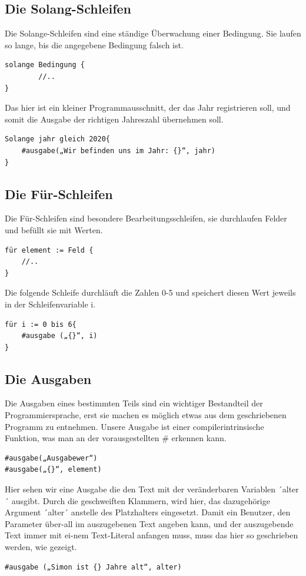 \documentclass[a4paper, 12pt]{article}
\begin{document}
\subsection{Die Solang-Schleifen}
Die Solange-Schleifen sind eine ständige Überwachung einer Bedingung. Sie laufen so lange, bis die angegebene Bedingung falsch ist.

\begin{verbatim}
solange Bedingung {
        //..
}
\end{verbatim}
Das hier ist ein kleiner Programmausschnitt, der das Jahr registrieren soll, und somit die Ausgabe der richtigen Jahreszahl übernehmen soll.

\begin{verbatim}
Solange jahr gleich 2020{
	#ausgabe(„Wir befinden uns im Jahr: {}“, jahr)
}

\end{verbatim}

\subsection{Die Für-Schleifen}
Die Für-Schleifen sind besondere Bearbeitungsschleifen, sie durchlaufen Felder und befüllt sie mit Werten.

\begin{verbatim}
für element := Feld {
    //..
}
\end{verbatim}
Die folgende Schleife durchläuft die Zahlen 0-5 und speichert diesen Wert jeweils in der Schleifenvariable i.
\begin{verbatim}
für i := 0 bis 6{
	#ausgabe („{}“, i)
}
\end{verbatim}

\subsection{Die Ausgaben}
Die Ausgaben eines bestimmten Teils sind ein wichtiger Bestandteil der Programmiersprache, erst sie machen es möglich etwas aus dem geschriebenen Programm zu entnehmen. Unsere Ausgabe ist einer compilerintrinsische Funktion, was man an der vorausgestellten \# erkennen kann.

\begin{verbatim}
#ausgabe(„Ausgabewer“)
#ausgabe(„{}“, element)
\end{verbatim}

Hier sehen wir eine Ausgabe die den Text mit der veränderbaren Variablen ´alter´ ausgibt. Durch die geschweiften Klammern, wird hier, das dazugehörige Argument ´alter´ anstelle des Platzhalters eingesetzt. Damit ein Benutzer, den Parameter über-all im auszugebenen Text angeben kann, und der auszugebende Text immer mit ei-nem Text-Literal anfangen muss, muss das hier so geschrieben werden, wie gezeigt. 
\begin{verbatim}
#ausgabe („Simon ist {} Jahre alt“, alter)
\end{verbatim}
\end{document}
